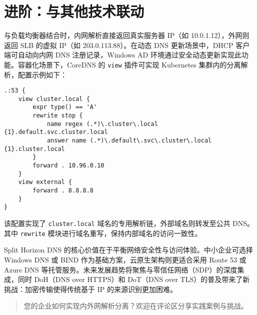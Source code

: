 \chapter{进阶：与其他技术联动}
与负载均衡器结合时，内网解析直接返回真实服务器 IP（如 10.0.1.12），外网则返回 SLB 的虚拟 IP（如 203.0.113.88）。在动态 DNS 更新场景中，DHCP 客户端可自动向内网 DNS 注册记录，Windows AD 环境通过安全动态更新实现此功能。容器化场景下，CoreDNS 的 \texttt{view} 插件可实现 Kubernetes 集群内的分离解析，配置示例如下：\par
\begin{lstlisting}[language=corefile]
.:53 {
    view cluster.local {
        expr type() == 'A'  
        rewrite stop {
            name regex (.*)\.cluster\.local {1}.default.svc.cluster.local
            answer name (.*)\.default\.svc\.cluster\.local {1}.cluster.local
        }
        forward . 10.96.0.10
    }
    view external {
        forward . 8.8.8.8
    }
}
\end{lstlisting}
该配置实现了 \texttt{cluster.local} 域名的专用解析链，外部域名则转发至公共 DNS。其中 \texttt{rewrite} 模块进行域名重写，保持内部域名的访问一致性。\par
Split Horizon DNS 的核心价值在于平衡网络安全性与访问体验。中小企业可选择 Windows DNS 或 BIND 作为基础方案，云原生架构则更适合采用 Route 53 或 Azure DNS 等托管服务。未来发展趋势将聚焦与零信任网络（SDP）的深度集成，同时 DoH（DNS over HTTPS）和 DoT（DNS over TLS）的普及带来了新挑战：加密传输使得传统基于 IP 的来源识别更加困难。\par
\begin{quote}
您的企业如何实现内外网解析分离？欢迎在评论区分享实践案例与挑战。\par
\end{quote}
